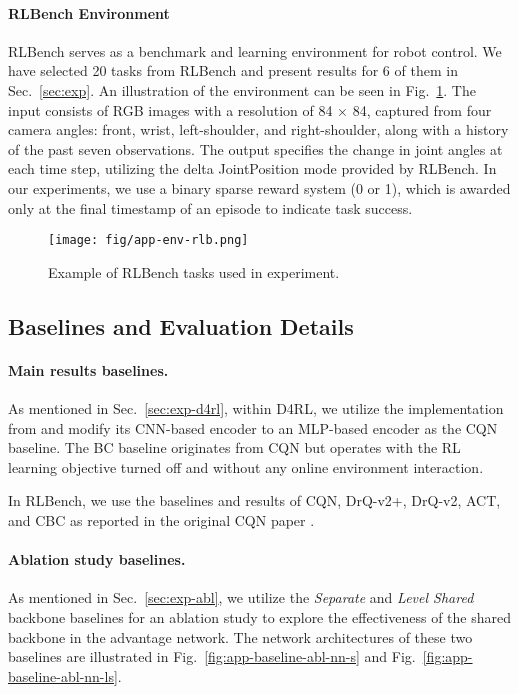 \paragraph{RLBench Environment}
RLBench \cite{RLBench} serves as a benchmark and learning environment for robot control. 
We have selected 20 tasks from RLBench and present results for 6 of them in Sec.~\ref{sec:exp}. 
An illustration of the environment can be seen in Fig.~\ref{fig:app-env-rlb}. 
The input consists of RGB images with a resolution of 84 × 84, captured from four camera angles: front, wrist, left-shoulder, and right-shoulder, along with a history of the past seven observations. 
The output specifies the change in joint angles at each time step, utilizing the delta JointPosition mode provided by RLBench. 
In our experiments, we use a binary sparse reward system (0 or 1), which is awarded only at the final timestamp of an episode to indicate task success.

\begin{figure}[h]
    \centering
    \texttt{[image: fig/app-env-rlb.png]}
    \caption{Example of RLBench tasks used in experiment.}
    \label{fig:app-env-rlb}
\end{figure}



\subsection{Baselines and Evaluation Details}
\label{sec:app-baseline}

\paragraph{Main results baselines.}
As mentioned in Sec.~\ref{sec:exp-d4rl}, within D4RL, we utilize the implementation from \cite{CQN} and modify its CNN-based encoder to an MLP-based encoder as the CQN baseline. 
The BC baseline originates from CQN but operates with the RL learning objective turned off and without any online environment interaction.

In RLBench, we use the baselines and results of CQN, DrQ-v2+, DrQ-v2, ACT, and CBC as reported in the original CQN paper \cite{CQN}.

\paragraph{Ablation study baselines.}
As mentioned in Sec.~\ref{sec:exp-abl}, we utilize the \textit{Separate} and \textit{Level Shared} backbone baselines for an ablation study to explore the effectiveness of the shared backbone in the advantage network. 
The network architectures of these two baselines are illustrated in Fig.~\ref{fig:app-baseline-abl-nn-s} and Fig.~\ref{fig:app-baseline-abl-nn-ls}.

